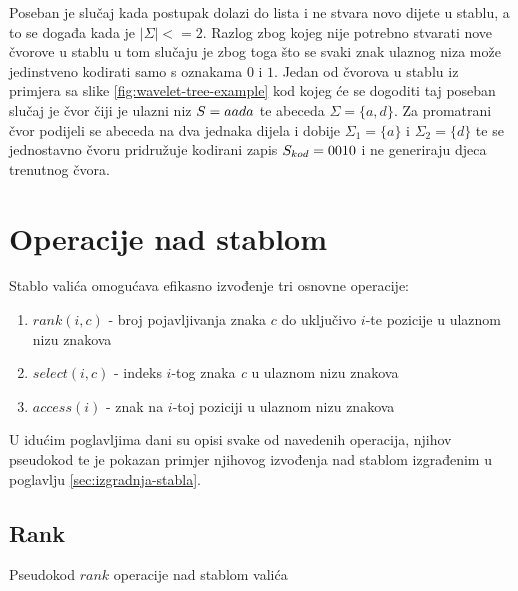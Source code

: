 \documentclass[times, utf8, seminar, numeric]{fer}
\begin{document}
Poseban je slučaj kada postupak dolazi do lista i ne stvara novo dijete u stablu, a to se događa kada je $|\Sigma| <= 2$. Razlog zbog kojeg nije potrebno stvarati nove čvorove u stablu u tom slučaju je zbog toga što se svaki znak ulaznog niza može jedinstveno kodirati samo s oznakama $0$ i $1$. Jedan od čvorova u stablu iz primjera sa slike \ref{fig:wavelet-tree-example} kod kojeg će se dogoditi taj poseban slučaj je čvor čiji je ulazni niz $\mathnormal{S} = aada$ te abeceda $ \Sigma = \{a,d\} $. Za promatrani čvor podijeli se abeceda na dva jednaka dijela i dobije $ \Sigma_1 = \{a\} $ i $ \Sigma_2 = \{d\} $ te se jednostavno čvoru pridružuje kodirani zapis $ \mathnormal{S}_{kod} = 0010 $ i ne generiraju djeca trenutnog čvora.

\section{Operacije nad stablom}
\label{sec:operacije-nad-stablom}

Stablo valića omogućava efikasno izvođenje tri osnovne operacije:

\begin{enumerate}
	\item $rank(i, c)$ - broj pojavljivanja znaka $c$ do uključivo $i$-te pozicije u ulaznom nizu znakova
	\item $select(i, c)$ - indeks $i$-tog znaka \textit{c} u ulaznom nizu znakova
	\item $access(i)$ - znak na $i$-toj poziciji u ulaznom nizu znakova
\end{enumerate}


U idućim poglavljima dani su opisi svake od navedenih operacija, njihov pseudokod te je pokazan primjer njihovog izvođenja nad stablom izgrađenim u poglavlju \ref{sec:izgradnja-stabla}.

\subsection{Rank}

\begin{algorithm}[H]
 \caption{Pseudokod $rank$ operacije nad stablom valića}
\end{algorithm}
\end{document}
